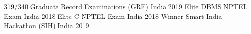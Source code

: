 


\begin{cvhonors}

  \cvhonor
    {319/340} %
    {Graduate Record Examinations (GRE)} %
    {India} %
    {2019} %
  \cvhonor
    {Elite} %
    {DBMS NPTEL Exam} %
    {India} %
    {2018} %
  \cvhonor
    {Elite} %
    {C NPTEL Exam} %
    {India} %
    {2018} %
  \cvhonor
    {Winner} %
    {Smart India Hackathon (SIH)} %
    {India} %
    {2019} %
\end{cvhonors}